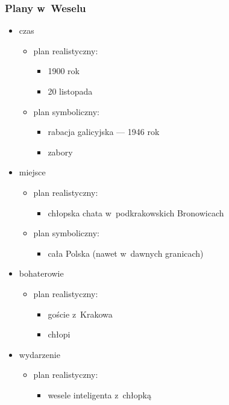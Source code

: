 \subsubsection*{Plany w~Weselu}
\begin{itemize}
    \item czas
        \begin{itemize}
            \item plan realistyczny:
                \begin{itemize}
                    \item 1900 rok
                    \item 20 listopada
                \end{itemize}
            \item plan symboliczny:
                \begin{itemize}
                    \item rabacja galicyjska --- 1946 rok
                    \item zabory 
                \end{itemize}
        \end{itemize}
    \item miejsce
        \begin{itemize}
            \item plan realistyczny:
                \begin{itemize}
                    \item chłopska chata w~podkrakowskich Bronowicach
                \end{itemize}
            \item plan symboliczny:
                \begin{itemize}
                    \item cała Polska (nawet w~dawnych granicach)
                \end{itemize}
        \end{itemize}
    \item bohaterowie
        \begin{itemize}
            \item plan realistyczny:
                \begin{itemize}
                    \item goście z~Krakowa
                    \item chłopi
                \end{itemize}
        \end{itemize}
    \item wydarzenie
        \begin{itemize}
            \item plan realistyczny:
                \begin{itemize}
                    \item wesele inteligenta z~chłopką
                \end{itemize}
        \end{itemize}
\end{itemize}
